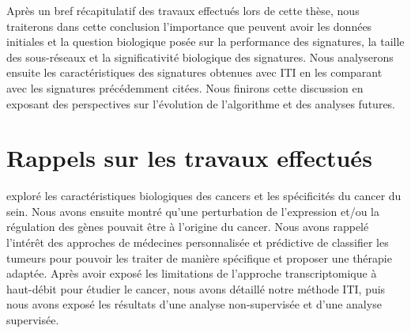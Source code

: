 \singlespacing

		\begin{center}
			\begin{tcolorbox}[colback=blue!5!white,colframe=blue!45!black,arc=0mm]
				\sffamily
				Après un bref récapitulatif des travaux effectués lors de cette thèse, nous traiterons dans cette conclusion l'importance que peuvent avoir les données initiales et la question biologique posée sur la performance des signatures, la taille des sous-réseaux et la significativité biologique des signatures.
				Nous analyserons ensuite les caractéristiques des signatures obtenues avec ITI en les comparant avec les signatures précédemment citées.
				Nous finirons cette discussion en exposant des perspectives sur l'évolution de l'algorithme et des analyses futures.
			\end{tcolorbox}
			\vspace{5ex}
			\minitoc
		\end{center}
		\newpage

\doublespacing

	\section{\textcolor{blue!45!black}{Rappels sur les travaux effectués}}
		 exploré les caractéristiques biologiques des cancers et les spécificités du cancer du sein.
		Nous avons ensuite montré qu'une perturbation de l'expression et/ou la régulation des gènes pouvait être à l'origine du cancer.
		Nous avons rappelé l'intérêt des approches de médecines personnalisée et prédictive de classifier les tumeurs pour pouvoir les traiter de manière spécifique et proposer une thérapie adaptée.
		Après avoir exposé les limitations de l'approche transcriptomique à haut-débit pour étudier le cancer, nous avons détaillé notre méthode ITI, puis nous avons exposé les résultats d'une analyse non-supervisée et d'une analyse supervisée.

